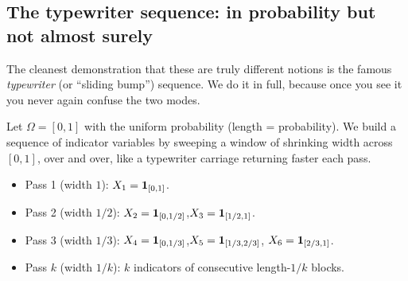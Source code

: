 \subsection{The typewriter sequence: in probability but not almost surely}
\label{ch22:typewriter}

The cleanest demonstration that these are truly different notions is the famous
\emph{typewriter} (or ``sliding bump'') sequence. We do it in full, because once you
see it you never again confuse the two modes.

Let $\Omega = [0,1]$ with the uniform probability (length = probability). We build a
sequence of indicator variables by sweeping a window of shrinking width across
$[0,1]$, over and over, like a typewriter carriage returning faster each pass.

\begin{itemize}
\item Pass 1 (width $1$): $X_1 = \mathbf{1}_{[0,1]}$.
\item Pass 2 (width $1/2$): $X_2 = \mathbf{1}_{[0,1/2]}$,\quad $X_3 = \mathbf{1}_{[1/2,1]}$.
\item Pass 3 (width $1/3$): $X_4 = \mathbf{1}_{[0,1/3]}$,\quad $X_5 = \mathbf{1}_{[1/3,2/3]}$,\quad
      $X_6 = \mathbf{1}_{[2/3,1]}$.
\item Pass $k$ (width $1/k$): $k$ indicators of consecutive length-$1/k$ blocks.
\end{itemize}

